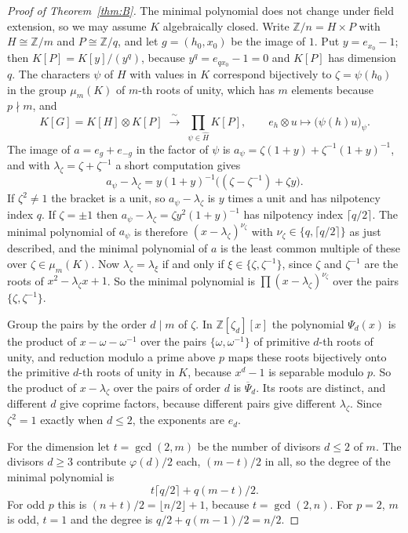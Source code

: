 \documentclass[11pt]{amsart}
\theoremstyle{definition}
\theoremstyle{remark}
\numberwithin{equation}{section}
\newcommand{\Z}{\mathbb{Z}}
\begin{document}
\begin{proof}[Proof of Theorem~\ref{thm:B}]
The minimal polynomial does not change under field extension, so we may assume $K$ algebraically closed. Write $\Z/n=H\times P$ with $H\cong\Z/m$ and $P\cong\Z/q$, and let $g=(h_0,x_0)$ be the image of $1$. Put $y=e_{x_0}-1$; then $K[P]=K[y]/(y^q)$, because $y^q=e_{qx_0}-1=0$ and $K[P]$ has dimension $q$. The characters $\psi$ of $H$ with values in $K$ correspond bijectively to $\zeta=\psi(h_0)$ in the group $\mu_m(K)$ of $m$-th roots of unity, which has $m$ elements because $p\nmid m$, and
\[
K[G]=K[H]\otimes K[P]\;\xrightarrow{\ \sim\ }\;\prod_{\psi\in\widehat H}K[P],\qquad e_{h}\otimes u\mapsto\bigl(\psi(h)u\bigr)_\psi .
\]
The image of $a=e_g+e_{-g}$ in the factor of $\psi$ is $a_\psi=\zeta(1+y)+\zeta^{-1}(1+y)^{-1}$, and with $\lambda_\zeta=\zeta+\zeta^{-1}$ a short computation gives
\[
a_\psi-\lambda_\zeta=y(1+y)^{-1}\bigl((\zeta-\zeta^{-1})+\zeta y\bigr).
\]
If $\zeta^2\ne1$ the bracket is a unit, so $a_\psi-\lambda_\zeta$ is $y$ times a unit and has nilpotency index $q$. If $\zeta=\pm1$ then $a_\psi-\lambda_\zeta=\zeta y^2(1+y)^{-1}$ has nilpotency index $\lceil q/2\rceil$. The minimal polynomial of $a_\psi$ is therefore $(x-\lambda_\zeta)^{\nu_\zeta}$ with $\nu_\zeta\in\{q,\lceil q/2\rceil\}$ as just described, and the minimal polynomial of $a$ is the least common multiple of these over $\zeta\in\mu_m(K)$. Now $\lambda_\zeta=\lambda_\xi$ if and only if $\xi\in\{\zeta,\zeta^{-1}\}$, since $\zeta$ and $\zeta^{-1}$ are the roots of $x^2-\lambda_\zeta x+1$. So the minimal polynomial is $\prod(x-\lambda_\zeta)^{\nu_\zeta}$ over the pairs $\{\zeta,\zeta^{-1}\}$.

Group the pairs by the order $d\mid m$ of $\zeta$. In $\Z[\zeta_d][x]$ the polynomial $\Psi_d(x)$ is the product of $x-\omega-\omega^{-1}$ over the pairs $\{\omega,\omega^{-1}\}$ of primitive $d$-th roots of unity, and reduction modulo a prime above $p$ maps these roots bijectively onto the primitive $d$-th roots of unity in $K$, because $x^d-1$ is separable modulo $p$. So the product of $x-\lambda_\zeta$ over the pairs of order $d$ is $\overline{\Psi}_d$. Its roots are distinct, and different $d$ give coprime factors, because different pairs give different $\lambda_\zeta$. Since $\zeta^2=1$ exactly when $d\le2$, the exponents are $e_d$.

For the dimension let $t=\gcd(2,m)$ be the number of divisors $d\le2$ of $m$. The divisors $d\ge3$ contribute $\varphi(d)/2$ each, $(m-t)/2$ in all, so the degree of the minimal polynomial is
\[
t\lceil q/2\rceil+q(m-t)/2.
\] For odd $p$ this is $(n+t)/2=\lfloor n/2\rfloor+1$, because $t=\gcd(2,n)$. For $p=2$, $m$ is odd, $t=1$ and the degree is $q/2+q(m-1)/2=n/2$.
\end{proof}
\end{document}
